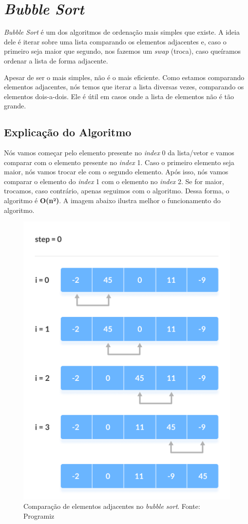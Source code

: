 \section{\textit{Bubble Sort}}

\textit{Bubble Sort} é um dos algoritmos de ordenação mais simples que existe. A ideia dele é iterar sobre uma lista comparando os elementos adjacentes e, caso o primeiro seja maior que segundo, nos fazemos um \textit{swap} (troca), caso queíramos ordenar a lista de forma adjacente.

Apesar de ser o mais simples, não é o mais eficiente. Como estamos comparando elementos adjacentes, nós temos que iterar a lista diversas vezes, comparando os elementos dois-a-dois. Ele é útil em casos onde a lista de elementos não é tão grande.

\subsection{Explicação do Algoritmo}
Nós vamos começar pelo elemento presente no \textit{index} 0 da lista/vetor e vamos comparar com o elemento presente no \textit{index} 1. Caso o primeiro elemento seja maior, nós vamos trocar ele com o segundo elemento. Após isso, nós vamos comparar o elemento do \textit{index} 1 com o elemento no \textit{index} 2. Se for maior, trocamos, caso contrário, apenas seguimos com o algoritmo. Dessa forma, o algoritmo é \textbf{O(n²)}. A imagem abaixo ilustra melhor o funcionamento do algoritmo.
\begin{figure}[H]
    \centering
    \includegraphics[scale=0.5]{assets/bubble_sort.png}
    \caption{Comparação de elementos adjacentes no \textit{bubble sort}. Fonte: Programiz}
    \label{fig:bubble_sort_0}
\end{figure}

